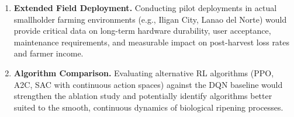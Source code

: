 \begin{enumerate}
        \item \textbf{Extended Field Deployment.} Conducting pilot deployments in actual smallholder farming environments (e.g., Iligan City, Lanao del Norte) would provide critical data on long-term hardware durability, user acceptance, maintenance requirements, and measurable impact on post-harvest loss rates and farmer income.

        \item \textbf{Algorithm Comparison.} Evaluating alternative RL algorithms (PPO, A2C, SAC with continuous action spaces) against the DQN baseline would strengthen the ablation study and potentially identify algorithms better suited to the smooth, continuous dynamics of biological ripening processes.
    \end{enumerate}
